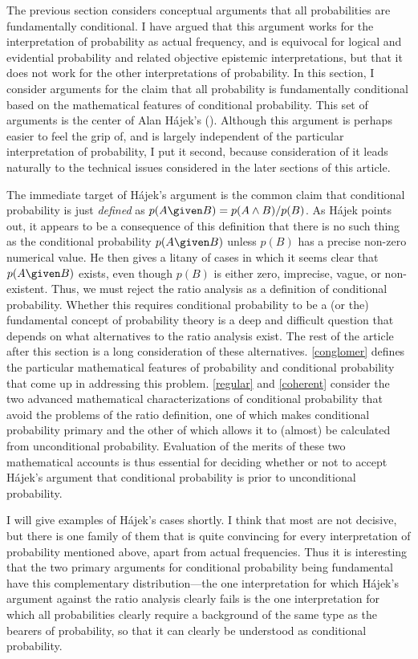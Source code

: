 The previous section considers conceptual arguments that all probabilities are fundamentally conditional. I have argued that this argument works for the interpretation of probability as actual frequency, and is equivocal for logical and evidential probability and related objective epistemic interpretations, but that it does not work for the other interpretations of probability. In this section, I consider arguments for the claim that all probability is fundamentally conditional based on the mathematical features of conditional probability. This set of arguments is the center of Alan H\'{a}jek's (\citeyear{wcpcnb}). Although this argument is perhaps easier to feel the grip of, and is largely independent of the particular interpretation of probability, I put it second, because consideration of it leads naturally to the technical issues considered in the later sections of this article.

The immediate target of H\'{a}jek's argument is the common claim that conditional probability is just \emph{defined} as $p(A \given B)=p(A\land B)/p(B)$. As H\'{a}jek points out, it appears to be a consequence of this definition that there is no such thing as the conditional probability $p(A \given B)$ unless $p(B)$ has a precise non-zero numerical value. He then gives a litany of cases in which it seems clear that $p(A \given B)$ exists, even though $p(B)$ is either zero, imprecise, vague, or non-existent. Thus, we must reject the ratio analysis as a definition of conditional probability. Whether this requires conditional probability to be a (or the) fundamental concept of probability theory is a deep and difficult question that depends on what alternatives to the ratio analysis exist. The rest of the article after this section is a long consideration of these alternatives. \autoref{conglomer} defines the particular mathematical features of probability and conditional probability that come up in addressing this problem. \autoref{regular} and \autoref{coherent} consider the two advanced mathematical characterizations of conditional probability that avoid the problems of the ratio definition, one of which makes conditional probability primary and the other of which allows it to (almost) be calculated from unconditional probability. Evaluation of the merits of these two mathematical accounts is thus essential for deciding whether or not to accept H\'{a}jek's argument that conditional probability is prior to unconditional probability.

I will give examples of H\'{a}jek's cases shortly. I think that most are not decisive, but there is one family of them that is quite convincing for every interpretation of probability mentioned above, apart from actual frequencies. Thus it is interesting that the two primary arguments for conditional probability being fundamental have this complementary distribution---the one interpretation for which H\'{a}jek's argument against the ratio analysis clearly fails is the one interpretation for which all probabilities clearly require a background of the same type as the bearers of probability, so that it can clearly be understood as conditional probability. 

